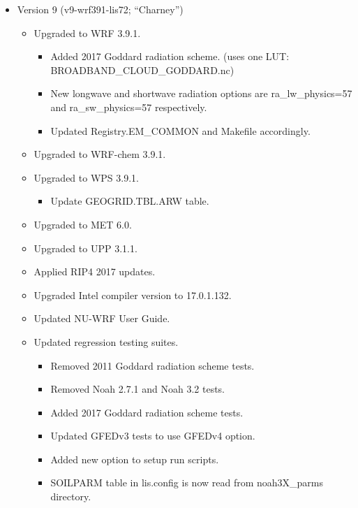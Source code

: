 \begin{itemize}
\item Version 9 (v9-wrf391-lis72; ``Charney'')
\begin{itemize}
\item Upgraded to WRF 3.9.1.
   \begin{itemize}
   \item Added 2017 Goddard radiation scheme.
   (uses one LUT: BROADBAND\_CLOUD\_GODDARD.nc)
   \item New longwave and shortwave radiation options are ra\_lw\_physics=57 and
    ra\_sw\_physics=57 respectively.
   \item Updated Registry.EM\_COMMON and Makefile accordingly.
   \end{itemize}

\item Upgraded to WRF-chem 3.9.1.
\item Upgraded to WPS 3.9.1.
   \begin{itemize}
   \item Update GEOGRID.TBL.ARW table.
   \end{itemize}

\item Upgraded to MET 6.0.
\item Upgraded to UPP 3.1.1.
\item Applied RIP4 2017 updates.
\item Upgraded Intel compiler version to 17.0.1.132.
\item Updated NU-WRF User Guide.
\item  Updated regression testing suites.
   \begin{itemize}
      \item Removed 2011 Goddard radiation scheme tests.
      \item Removed Noah 2.7.1 and Noah 3.2 tests.
      \item Added 2017 Goddard radiation scheme tests.
      \item Updated GFEDv3 tests to use GFEDv4 option.
      \item Added new option to setup run scripts.
      \item SOILPARM table in lis.config is now read from noah3X\_parms directory.
   \end{itemize}
\end{itemize}


\end{itemize}


